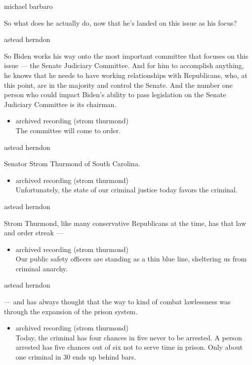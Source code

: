 michael barbaro

So what does he actually do, now that he's landed on this issue as his
focus?

astead herndon

So Biden works his way onto the most important committee that focuses on
this issue --- the Senate Judiciary Committee. And for him to accomplish
anything, he knows that he needs to have working relationships with
Republicans, who, at this point, are in the majority and control the
Senate. And the number one person who could impact Biden's ability to
pass legislation on the Senate Judiciary Committee is its chairman.

\begin{itemize}
\tightlist
\item
  archived recording (strom thurmond)\\
  The committee will come to order.
\end{itemize}

astead herndon

Senator Strom Thurmond of South Carolina.

\begin{itemize}
\tightlist
\item
  archived recording (strom thurmond)\\
  Unfortunately, the state of our criminal justice today favors the
  criminal.
\end{itemize}

astead herndon

Strom Thurmond, like many conservative Republicans at the time, has that
law and order streak ---

\begin{itemize}
\tightlist
\item
  archived recording (strom thurmond)\\
  Our public safety officers are standing as a thin blue line,
  sheltering us from criminal anarchy.
\end{itemize}

astead herndon

--- and has always thought that the way to kind of combat lawlessness
was through the expansion of the prison system.

\begin{itemize}
\tightlist
\item
  archived recording (strom thurmond)\\
  Today, the criminal has four chances in five never to be arrested. A
  person arrested has five chances out of six not to serve time in
  prison. Only about one criminal in 30 ends up behind bars.
\end{itemize}


